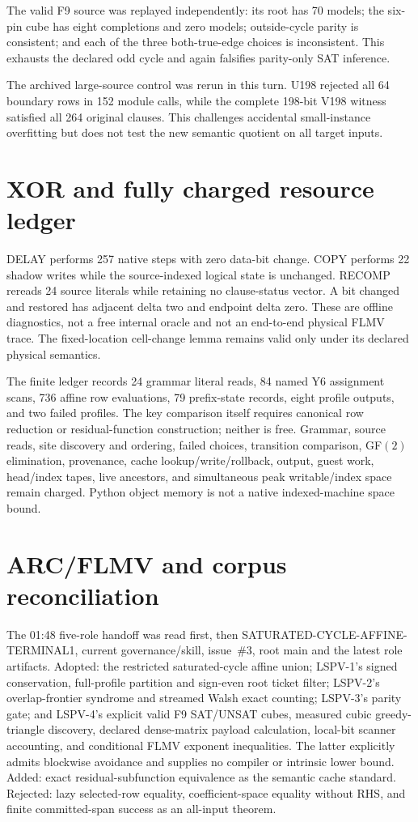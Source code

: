 \documentclass[11pt]{article}
\begin{document}
The valid F9 source was replayed independently: its root has 70 models; the six-pin cube has eight completions and zero models; outside-cycle parity is consistent; and each of the three both-true-edge choices is inconsistent.  This exhausts the declared odd cycle and again falsifies parity-only SAT inference.

The archived large-source control was rerun in this turn.  U198 rejected all 64 boundary rows in 152 module calls, while the complete 198-bit V198 witness satisfied all 264 original clauses.  This challenges accidental small-instance overfitting but does not test the new semantic quotient on all target inputs.

\section{XOR and fully charged resource ledger}
DELAY performs 257 native steps with zero data-bit change.  COPY performs 22 shadow writes while the source-indexed logical state is unchanged.  RECOMP rereads 24 source literals while retaining no clause-status vector.  A bit changed and restored has adjacent delta two and endpoint delta zero.  These are offline diagnostics, not a free internal oracle and not an end-to-end physical FLMV trace.  The fixed-location cell-change lemma remains valid only under its declared physical semantics.

The finite ledger records 24 grammar literal reads, 84 named Y6 assignment scans, 736 affine row evaluations, 79 prefix-state records, eight profile outputs, and two failed profiles.  The key comparison itself requires canonical row reduction or residual-function construction; neither is free.  Grammar, source reads, site discovery and ordering, failed choices, transition comparison, GF$(2)$ elimination, provenance, cache lookup/write/rollback, output, guest work, head/index tapes, live ancestors, and simultaneous peak writable/index space remain charged.  Python object memory is not a native indexed-machine space bound.

\section{ARC/FLMV and corpus reconciliation}
The 01:48 five-role handoff was read first, then SATURATED-CYCLE-AFFINE-TERMINAL1, current governance/skill, issue~\#3, root main and the latest role artifacts.  Adopted: the restricted saturated-cycle affine union; LSPV-1's signed conservation, full-profile partition and sign-even root ticket filter; LSPV-2's overlap-frontier syndrome and streamed Walsh exact counting; LSPV-3's parity gate; and LSPV-4's explicit valid F9 SAT/UNSAT cubes, measured cubic greedy-triangle discovery, declared dense-matrix payload calculation, local-bit scanner accounting, and conditional FLMV exponent inequalities.  The latter explicitly admits blockwise avoidance and supplies no compiler or intrinsic lower bound.  Added: exact residual-subfunction equivalence as the semantic cache standard.  Rejected: lazy selected-row equality, coefficient-space equality without RHS, and finite committed-span success as an all-input theorem.
\end{document}
